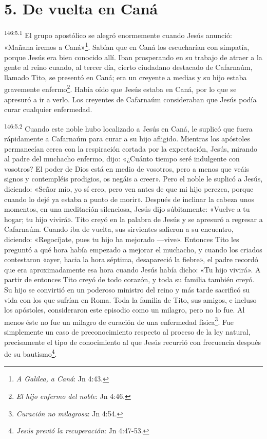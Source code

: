 \section*{5. De vuelta en Caná}
\par
\textsuperscript{146:5.1} El grupo apostólico se alegró enormemente cuando Jesús anunció: «Mañana iremos a Caná»\footnote{\textit{A Galilea, a Caná}: Jn 4:43.}. Sabían que en Caná los escucharían con simpatía, porque Jesús era bien conocido allí. Iban prosperando en su trabajo de atraer a la gente al reino cuando, al tercer día, cierto ciudadano destacado de Cafarnaúm, llamado Tito, se presentó en Caná; era un creyente a medias y su hijo estaba gravemente enfermo\footnote{\textit{El hijo enfermo del noble}: Jn 4:46.}. Había oído que Jesús estaba en Caná, por lo que se apresuró a ir a verlo. Los creyentes de Cafarnaúm consideraban que Jesús podía curar cualquier enfermedad.

\par
\textsuperscript{146:5.2} Cuando este noble hubo localizado a Jesús en Caná, le suplicó que fuera rápidamente a Cafarnaúm para curar a su hijo afligido. Mientras los apóstoles permanecían cerca con la respiración cortada por la expectación, Jesús, mirando al padre del muchacho enfermo, dijo: «¿Cuánto tiempo seré indulgente con vosotros? El poder de Dios está en medio de vosotros, pero a menos que veáis signos y contempléis prodigios, os negáis a creer». Pero el noble le suplicó a Jesús, diciendo: «Señor mío, yo sí creo, pero ven antes de que mi hijo perezca, porque cuando lo dejé ya estaba a punto de morir». Después de inclinar la cabeza unos momentos, en una meditación silenciosa, Jesús dijo súbitamente: «Vuelve a tu hogar; tu hijo vivirá». Tito creyó en la palabra de Jesús y se apresuró a regresar a Cafarnaúm. Cuando iba de vuelta, sus sirvientes salieron a su encuentro, diciendo: «Regocíjate, pues tu hijo ha mejorado ---vive». Entonces Tito les preguntó a qué hora había empezado a mejorar el muchacho, y cuando los criados contestaron «ayer, hacia la hora séptima, desapareció la fiebre», el padre recordó que era aproximadamente esa hora cuando Jesús había dicho: «Tu hijo vivirá». A partir de entonces Tito creyó de todo corazón, y toda su familia también creyó. Su hijo se convirtió en un poderoso ministro del reino y más tarde sacrificó su vida con los que sufrían en Roma. Toda la familia de Tito, sus amigos, e incluso los apóstoles, consideraron este episodio como un milagro, pero no lo fue. Al menos éste no fue un milagro de curación de una enfermedad física\footnote{\textit{Curación no milagrosa}: Jn 4:54.}. Fue simplemente un caso de preconocimiento respecto al proceso de la ley natural, precisamente el tipo de conocimiento al que Jesús recurrió con frecuencia después de su bautismo\footnote{\textit{Jesús previó la recuperación}: Jn 4:47-53.}.

